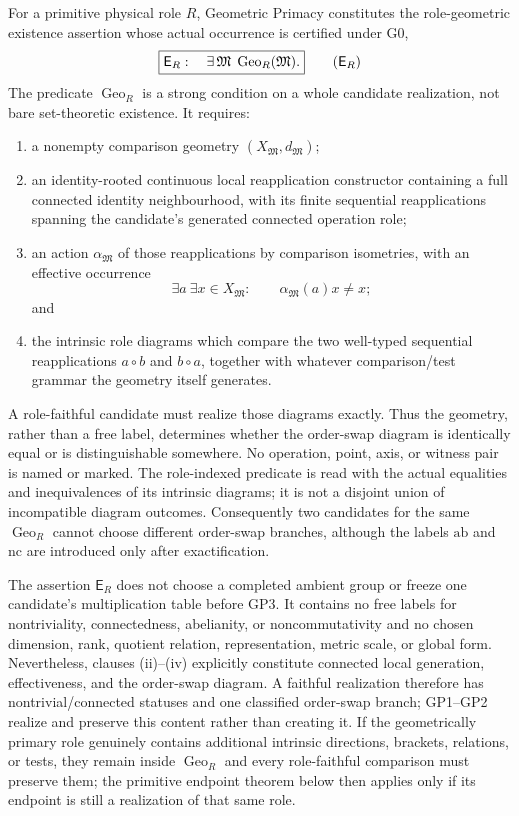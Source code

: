 \documentclass[12pt,a4paper]{article}
\begin{document}
\begin{definition}
\label{p2:def:geometric-role-existence}
For a primitive physical role \(R\), Geometric Primacy constitutes the
role-geometric existence assertion whose actual occurrence is certified under
G0,
\[
 \boxed{\mathsf E_R:\quad
 \exists\,\mathfrak M\;\operatorname{Geo}_R(\mathfrak M).}
 \tag{\ensuremath{\mathsf E_R}}
\]
The predicate \(\operatorname{Geo}_R\) is a strong condition on a whole
candidate realization, not bare set-theoretic existence.  It requires:
\begin{enumerate}[label=(\roman*),leftmargin=2em]
\item a nonempty comparison geometry \((X_{\mathfrak M},d_{\mathfrak M})\);
\item an identity-rooted continuous local reapplication constructor containing
a full connected identity neighbourhood, with its finite sequential
reapplications spanning the candidate's generated connected operation role;
\item an action \(\alpha_{\mathfrak M}\) of those reapplications by comparison
isometries, with an effective occurrence
\[
 \exists a\ \exists x\in X_{\mathfrak M}:\qquad
 \alpha_{\mathfrak M}(a)x\ne x;
\]
and
\item the intrinsic role diagrams which compare the two well-typed sequential
reapplications \(a\circ b\) and \(b\circ a\), together with whatever
comparison/test grammar the geometry itself generates.
\end{enumerate}
A role-faithful candidate must realize those diagrams exactly.  Thus the
geometry, rather than a free label, determines whether the order-swap diagram
is identically equal or is distinguishable somewhere.  No operation, point,
axis, or witness pair is named or marked.  The role-indexed predicate is read
with the actual equalities and inequivalences of its intrinsic diagrams; it is
not a disjoint union of incompatible diagram outcomes.  Consequently two
candidates for the same \(\operatorname{Geo}_R\) cannot choose different
order-swap branches, although the labels \(\mathrm{ab}\) and \(\mathrm{nc}\)
are introduced only after exactification.

The assertion \(\mathsf E_R\) does not choose a completed ambient group or
freeze one candidate's multiplication table before GP3.  It contains no free
labels for nontriviality, connectedness, abelianity, or noncommutativity and no
chosen dimension, rank, quotient relation, representation, metric scale, or
global form.  Nevertheless, clauses (ii)--(iv) explicitly constitute
connected local generation, effectiveness, and the order-swap diagram.  A
faithful realization therefore has nontrivial/connected statuses and one
classified order-swap branch; GP1--GP2 realize and preserve this content rather
than creating it.  If the geometrically primary role genuinely contains
additional intrinsic directions, brackets, relations, or tests, they remain
inside \(\operatorname{Geo}_R\) and every role-faithful comparison must preserve
them; the primitive endpoint theorem below then applies only if its endpoint is
still a realization of that same role.
\end{definition}
\end{document}
